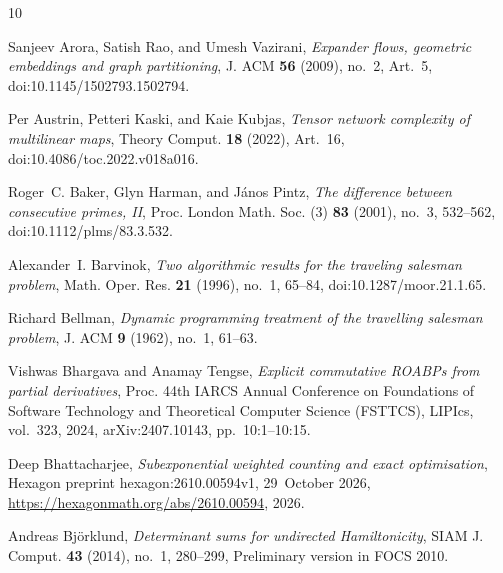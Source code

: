 \documentclass[10pt]{amsart}
\theoremstyle{plain}
\theoremstyle{definition}
\theoremstyle{remark}
\numberwithin{equation}{section}
\begin{document}
\providecommand{\bysame}{\leavevmode\hbox to3em{\hrulefill}\thinspace}
\providecommand{\MR}{\relax\ifhmode\unskip\space\fi MR }
\providecommand{\MRhref}[2]{%
  \href{http://www.ams.org/mathscinet-getitem?mr=#1}{#2}
}
\providecommand{\href}[2]{#2}
\begin{thebibliography}{10}

Sanjeev Arora, Satish Rao, and Umesh Vazirani, \emph{Expander flows, geometric
  embeddings and graph partitioning}, J. ACM \textbf{56} (2009), no.~2, Art.~5,
  doi:10.1145/1502793.1502794.

Per Austrin, Petteri Kaski, and Kaie Kubjas, \emph{Tensor network complexity of
  multilinear maps}, Theory Comput. \textbf{18} (2022), Art.~16,
  doi:10.4086/toc.2022.v018a016.

Roger~C. Baker, Glyn Harman, and J{\'a}nos Pintz, \emph{The difference between
  consecutive primes, {II}}, Proc. London Math. Soc. (3) \textbf{83} (2001),
  no.~3, 532--562, doi:10.1112/plms/83.3.532.

Alexander~I. Barvinok, \emph{Two algorithmic results for the traveling salesman
  problem}, Math. Oper. Res. \textbf{21} (1996), no.~1, 65--84,
  doi:10.1287/moor.21.1.65.

Richard Bellman, \emph{Dynamic programming treatment of the travelling salesman
  problem}, J. ACM \textbf{9} (1962), no.~1, 61--63.

Vishwas Bhargava and Anamay Tengse, \emph{Explicit commutative {ROABP}s from
  partial derivatives}, Proc. 44th IARCS Annual Conference on Foundations of
  Software Technology and Theoretical Computer Science (FSTTCS), LIPIcs,
  vol.~323, 2024, arXiv:2407.10143, pp.~10:1--10:15.

Deep Bhattacharjee, \emph{Subexponential weighted counting and exact
  optimisation}, Hexagon preprint hexagon:2610.00594v1, 29~October 2026,
  \url{https://hexagonmath.org/abs/2610.00594}, 2026.

Andreas Bj{\"o}rklund, \emph{Determinant sums for undirected {H}amiltonicity},
  SIAM J. Comput. \textbf{43} (2014), no.~1, 280--299, Preliminary version in
  FOCS 2010.


\end{thebibliography}
\end{document}
